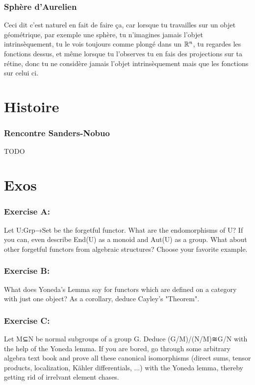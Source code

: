 \documentclass[12pt,makeidx, draft]{amsart}
\begin{document}
\section{Sphère d'Aurelien}
Ceci dit c'est naturel en fait de faire ça, car lorsque tu travailles sur un objet géométrique, par exemple une sphère, tu n'imagines jamais l'objet intrinsèquement, tu le vois toujours comme plongé dans un $\mathbb{R}^n$, tu regardes les fonctions dessus, et même lorsque tu l'observes tu en fais des projections sur ta rétine, donc tu ne considère jamais l'objet intrinsèquement mais que les fonctions sur celui ci.

\part{Histoire}

\section{Rencontre Sanders-Nobuo}
TODO

\part{Exos}
\section{Exercise A:} Let U:Grp→Set be the forgetful functor. What are the endomorphisms of U? If you can, even describe End(U) as a monoid and Aut(U) as a group. What about other forgetful functors from algebraic structures? Choose your favorite example. 

\section{Exercise B:} What does Yoneda's Lemma say for functors which are defined on a category with just one object? As a corollary, deduce Cayley's "Theorem". 

\section{Exercise C:} Let M⊆N be normal subgroups of a group G. Deduce (G/M)/(N/M)≅G/N with the help of the Yoneda lemma. If you are bored, go through some arbitrary algebra text book and prove all these canonical isomorphisms (direct sums, tensor products, localization, Kähler differentials, ...) with the Yoneda lemma, thereby getting rid of irrelvant element chases. 
\end{document}
